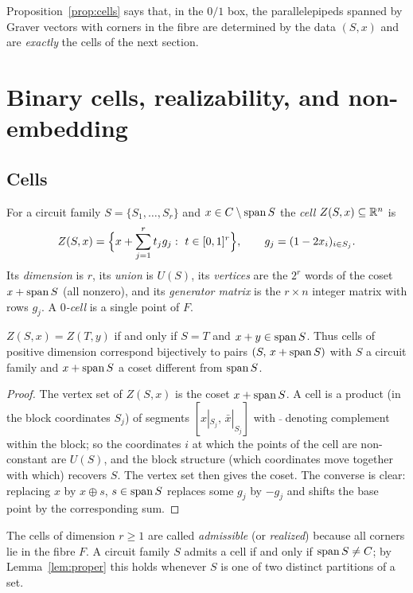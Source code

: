 Proposition~\ref{prop:cells} says that, in the $0/1$ box, the parallelepipeds spanned by Graver vectors with corners in the fibre are determined by the data $(S,x)$ and are \emph{exactly} the cells of the next section.

\section{Binary cells, realizability, and non-embedding}\label{sec:cells}

\subsection{Cells}

\begin{definition}[Cell]\label{def:cell}
For a circuit family $S=\{S_1,\dots,S_r\}$ and $x\in C\setminus\operatorname{span} S$ the \emph{cell} $Z(S,x)\subseteq\mathbb R^n$ is
\[
Z(S,x)=\Bigl\{x+\sum_{j=1}^rt_jg_j:\ t\in[0,1]^r\Bigr\},\qquad g_j=(1-2x_i)_{i\in S_j}.
\]
Its \emph{dimension} is $r$, its \emph{union} is $U(S)$, its \emph{vertices} are the $2^r$ words of the coset $x+\operatorname{span} S$ (all nonzero), and its \emph{generator matrix} is the $r\times n$ integer matrix with rows $g_j$. A \emph{$0$-cell} is a single point of $F$.
\end{definition}

\begin{lemma}\label{lem:cellpair}
$Z(S,x)=Z(T,y)$ if and only if $S=T$ and $x+y\in\operatorname{span} S$. Thus cells of positive dimension correspond bijectively to pairs $(S,\,x+\operatorname{span} S)$ with $S$ a circuit family and $x+\operatorname{span} S$ a coset different from $\operatorname{span} S$.
\end{lemma}

\begin{proof}
The vertex set of $Z(S,x)$ is the coset $x+\operatorname{span} S$. A cell is a product (in the block coordinates $S_j$) of segments $[x|_{S_j},\,\bar x|_{S_j}]$ with $\bar{\ }$ denoting complement within the block; so the coordinates $i$ at which the points of the cell are non-constant are $U(S)$, and the block structure (which coordinates move together with which) recovers $S$. The vertex set then gives the coset. The converse is clear: replacing $x$ by $x\oplus s$, $s\in\operatorname{span} S$ replaces some $g_j$ by $-g_j$ and shifts the base point by the corresponding sum.
\end{proof}

The cells of dimension $r\ge1$ are called \emph{admissible} (or \emph{realized}) because all corners lie in the fibre $F$. A circuit family $S$ admits a cell if and only if $\operatorname{span} S\ne C$; by Lemma~\ref{lem:proper} this holds whenever $S$ is one of two distinct partitions of a set.


